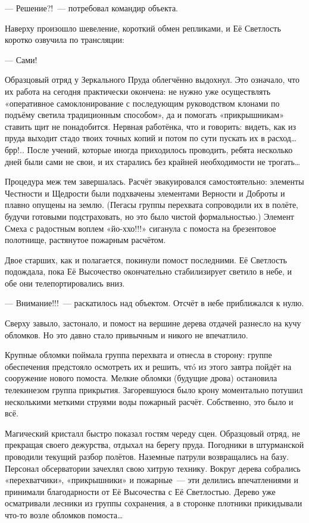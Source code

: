 \documentclass[twoside,a5paper,12pt]{extbook}
\begin{document}
— Решение?! — потребовал командир объекта.

Наверху произошло шевеление, короткий обмен репликами, и Её Светлость коротко озвучила по трансляции:

— Сами!

Образцовый отряд у Зеркального Пруда облегчённо выдохнул. Это означало, что их работа на сегодня практически окончена: не нужно уже осуществлять «оперативное самоклонирование с последующим руководством клонами по подъёму светила традиционным способом», да и помогать «прикрышникам» ставить щит не понадобится. Нервная работёнка, что и говорить: видеть, как из пруда выходит стадо твоих точных копий и потом по сути пускать их в расход… брр!.. После учений, которые иногда приходилось проводить, ребята несколько дней были сами не свои, и их старались без крайней необходимости не трогать…

Процедура меж тем завершалась. Расчёт эвакуировался самостоятельно: элементы Честности и Щедрости были подхвачены элементами Верности и Доброты и плавно опущены на землю. (Пегасы группы перехвата сопроводили их в полёте, будучи готовыми подстраховать, но это было чистой формальностью.) Элемент Смеха с радостным воплем «йо-ххо!!!» сиганула с помоста на брезентовое полотнище, растянутое пожарным расчётом.

Двое старших, как и полагается, покинули помост последними. Её Светлость подождала, пока Её Высочество окончательно стабилизирует светило в небе, и обе они телепортировались вниз.

— Внимание!!! — раскатилось над объектом. Отсчёт в небе приближался к нулю.

Сверху завыло, застонало, и помост на вершине дерева отдачей разнесло на кучу обломков. Но это давно стало привычным и никого не впечатлило.

Крупные обломки поймала группа перехвата и отнесла в сторону: группе обеспечения предстояло осмотреть их и решить, чтó из этого завтра пойдёт на сооружение нового помоста. Мелкие обломки (будущие дрова) остановила телекинезом группа прикрытия. Загоревшуюся было крону моментально потушил несколькими меткими струями воды пожарный расчёт. Собственно, это было и всё.

Магический кристалл быстро показал гостям череду сцен. Образцовый отряд, не прекращая своего дежурства, отдыхал на берегу пруда. Погодники в штурманской проводили текущий разбор полётов. Наземные патрули возвращались на базу. Персонал обсерватории зачехлял свою хитрую технику. Вокруг дерева собрались «перехватчики», «прикрышники» и пожарные — эти делились впечатлениями и принимали благодарности от Её Высочества с Её Светлостью. Дерево уже осматривали лесники из группы сохранения, а в сторонке плотники прикидывали что-то возле обломков помоста…
\end{document}
